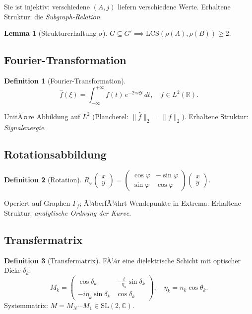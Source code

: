 ﻿\documentclass[a4paper,12pt]{scrreprt}
\theoremstyle{definition}
\newtheorem{definition}{Definition}[section]
\newtheorem{lemma}{Lemma}[section]
\begin{document}
Sie ist injektiv: verschiedene $(A,j)$ liefern verschiedene Werte.
Erhaltene Struktur: die \emph{Subgraph-Relation}.

\begin{lemma}[Strukturerhaltung $\sigma$]
  $G \subseteq G' \implies \mathrm{LCS}(\rho(A),\rho(B)) \geq 2.$
\end{lemma}

\subsection{Fourier-Transformation}

\begin{definition}[Fourier-Transformation]
  \[
    \hat{f}(\xi) = \int_{-\infty}^{+\infty} f(t)\,e^{-2\pi i\xi t}\,dt,
    \quad f \in L^2(\mathbb{R}).
  \]
\end{definition}

UnitÃ¤re Abbildung auf $L^2$ (Plancherel: $\|\hat f\|_2 = \|f\|_2$).
Erhaltene Struktur: \emph{Signalenergie}.

\subsection{Rotationsabbildung}

\begin{definition}[Rotation]
  $R_\varphi \begin{pmatrix}x\\y\end{pmatrix}
  = \begin{pmatrix}\cos\varphi & -\sin\varphi\\\sin\varphi &
  \cos\varphi\end{pmatrix}\begin{pmatrix}x\\y\end{pmatrix}.$
\end{definition}

Operiert auf Graphen $\Gamma_f$; Ã¼berfÃ¼hrt Wendepunkte in Extrema.
Erhaltene Struktur: \emph{analytische Ordnung der Kurve}.

\subsection{Transfermatrix}

\begin{definition}[Transfermatrix]
  FÃ¼r eine dielektrische Schicht mit optischer Dicke $\delta_k$:
  \[
    M_k = \begin{pmatrix}
      \cos\delta_k & -\tfrac{i}{\eta_k}\sin\delta_k \\
      -i\eta_k\sin\delta_k & \cos\delta_k
    \end{pmatrix}, \quad \eta_k = n_k\cos\theta_k.
  \]
  Systemmatrix: $M = M_N \cdots M_1 \in \mathrm{SL}(2,\mathbb{C})$.
\end{definition}
\end{document}
